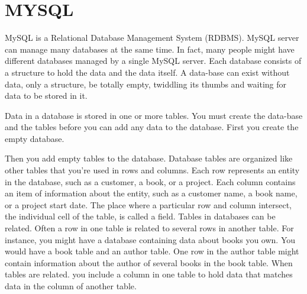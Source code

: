 \section{MYSQL}
MySQL is a Relational Database Management System (RDBMS). MySQL server
can manage many databases at the same time. In fact, many people might have different
databases managed by a single MySQL server. Each database consists of a structure to hold
the data and the data itself. A data-base can exist without data, only a structure, be totally
empty, twiddling its thumbs and waiting for data to be stored in it.

Data in a database is stored in one or more tables. You must create the data-base and
the tables before you can add any data to the database. First you create the empty database.

Then you add empty tables to the database. Database tables are organized like other tables
that you’re used in rows and columns. Each row represents an entity in the database, such as
a customer, a book, or a project. Each column contains an item of information about the
entity, such as a customer name, a book name, or a project start date. The place where a
particular row and column intersect, the individual cell of the table, is called a field. Tables
in databases can be related. Often a row in one table is related to several rows in another
table. For instance, you might have a database containing data about books you own. You
would have a book table and an author table. One row in the author table might contain
information about the author of several books in the book table. When tables are related.
you include a column in one table to hold data that matches data in the column of another
table.

